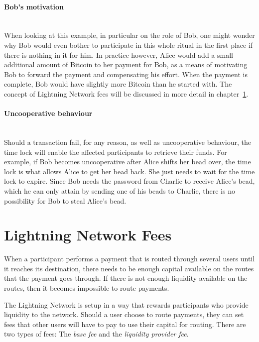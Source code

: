 \documentclass[a4paper, 12pt]{report}
\begin{document}
\paragraph{Bob’s motivation} \hspace{0pt} \\
When looking at this example, in particular on the role of Bob, one might wonder why Bob would even bother to participate in this whole ritual in the first place if there is nothing in it for him. In practice however, Alice would add a small additional amount of Bitcoin to her payment for Bob, as a means of motivating Bob to forward the payment and compensating his effort. When the payment is complete, Bob would have slightly more Bitcoin than he started with. The concept of Lightning Network fees will be discussed in more detail in chapter~\ref{sec:Lightning_Network_Fees}.

\paragraph{Uncooperative behaviour} \hspace{0pt} \\
Should a transaction fail, for any reason, as well as uncooperative behaviour, the time lock will enable the affected participants to retrieve their funds. For example, if Bob becomes uncooperative after Alice shifts her bead over, the time lock is what allows Alice to get her bead back. She just needs to wait for the time lock to expire. Since Bob needs the password from Charlie to receive Alice’s bead, which he can only attain by sending one of his beads to Charlie, there is no possibility for Bob to steal Alice’s bead.

\section{Lightning Network Fees} \label{sec:Lightning_Network_Fees}

\par When a participant performs a payment that is routed through several users until it reaches its destination, there needs to be enough capital available on the routes that the payment goes through. If there is not enough liquidity available on the routes, then it becomes impossible to route payments.

\par The Lightning Network is setup in a way that rewards participants who provide liquidity to the network. Should a user choose to route payments, they can set fees that other users will have to pay to use their capital for routing.\newline
There are two types of fees: The \textit{base fee} and the \textit{liquidity provider fee}.
\end{document}
